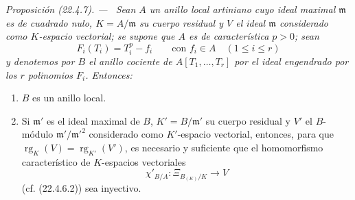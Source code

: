 \documentclass[10pt,oneside]{book}
\makeatletter
\newcommand{\setmanualcurrentlabel}[1]{\def\@currentlabel{#1}}
\newenvironment{proposition}[1][]{%
  \setmanualcurrentlabel{#1}\par\medskip\noindent\itshape Proposición (#1). ---\ }{\par}
\providecommand{\setmin}{-}%
\makeatother
\begin{document}
\begin{proposition}[22.4.7]
\label{0.22.4.7-es}
Sean $A$ un anillo local artiniano cuyo ideal maximal $\mathfrak m$ es de
cuadrado nulo, $K=A/\mathfrak m$ su cuerpo residual y $V$ el ideal $\mathfrak m$
considerado como $K$-espacio vectorial; se supone que $A$ es de
característica $p>0$; sean
\begin{equation}
\label{0.22.4.7.1-es}
  F_i(T_i)=T_i^p\setmin f_i\qquad\text{con }f_i\in A\quad(1\leqslant i\leqslant r)
  \tag{22.4.7.1}
\end{equation}
y denotemos por $B$ el anillo cociente de $A[T_1,\ldots,T_r]$ por el ideal
engendrado por los $r$ polinomios $F_i$. Entonces:
\begin{enumerate}
  \item[\rm(i)] $B$ es un anillo local.
  \item[\rm(ii)] Si $\mathfrak m'$ es el ideal maximal de $B$,
  $K'=B/\mathfrak m'$ su cuerpo residual y $V'$ el $B$-módulo
  $\mathfrak m'/\mathfrak m'^2$ considerado como $K'$-espacio vectorial, entonces,
  para que $\operatorname{rg}_K(V)=\operatorname{rg}_{K'}(V')$, es necesario y suficiente que el homomorfismo
  característico de $K$-espacios vectoriales
  \begin{equation}
  \label{0.22.4.7.2-es}
    \chi'_{B/A}:\Xi_{B_{(K)}/K}\longrightarrow V
    \tag{22.4.7.2}
  \end{equation}
  \textup{(cf. (22.4.6.2))} sea inyectivo.
\end{enumerate}
\end{proposition}
\end{document}

